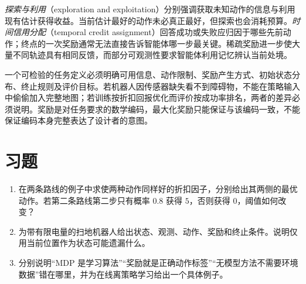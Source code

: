 \emph{探索与利用}（exploration and exploitation）分别强调获取未知动作的信息与利用现有估计获得收益。当前估计最好的动作未必真正最好，但探索也会消耗预算。\emph{时间信用分配}（temporal credit assignment）回答成功或失败应归因于哪些先前动作；终点的一次奖励通常无法直接告诉智能体哪一步最关键。稀疏奖励进一步使大量不同轨迹具有相同反馈，而部分可观测性要求智能体利用记忆辨认当前处境。

一个可检验的任务定义必须明确可用信息、动作限制、奖励产生方式、初始状态分布、终止规则及评价目标。若机器人因传感器缺失看不到障碍物，不能在策略输入中偷偷加入完整地图；若训练按折扣回报优化而评价按成功率排名，两者的差异必须说明。奖励是对任务要求的数学编码，最大化奖励只能保证与该编码一致，不能保证编码本身完整表达了设计者的意图。

\section{习题}
\begin{enumerate}
\item 在两条路线的例子中求使两种动作同样好的折扣因子，分别给出其两侧的最优动作。若第二条路线第二步只有概率 $0.8$ 获得 $5$，否则获得 $0$，阈值如何改变？
\item 为带有限电量的扫地机器人给出状态、观测、动作、奖励和终止条件。说明仅用当前位置作为状态可能遗漏什么。
\item 分别说明“MDP 是学习算法”“奖励就是正确动作标签”“无模型方法不需要环境数据”错在哪里，并为在线离策略学习给出一个具体例子。
\end{enumerate}





